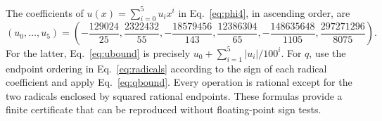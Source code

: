 \documentclass[aps,pra,reprint,onecolumn,notitlepage,longbibliography]{revtex4-2}
\begin{document}
The coefficients of $u(x)=\sum_{i=0}^5u_ix^i$ in Eq.~\eqref{eq:phi4}, in ascending order, are
\begin{equation}
 (u_0,\ldots,u_5)=\left(
 -\frac{129024}{25},\frac{2322432}{55},
 -\frac{18579456}{143},\frac{12386304}{65},
 -\frac{148635648}{1105},\frac{297271296}{8075}
 \right).
 \label{eq:ucoeff}
\end{equation}
For the latter, Eq.~\eqref{eq:ubound} is precisely $u_0+\sum_{i=1}^5|u_i|/100^i$. For $q$, use the endpoint ordering in Eq.~\eqref{eq:radicals} according to the sign of each radical coefficient and apply Eq.~\eqref{eq:qbound}. Every operation is rational except for the two radicals enclosed by squared rational endpoints. These formulas provide a finite certificate that can be reproduced without floating-point sign tests.


\end{document}

